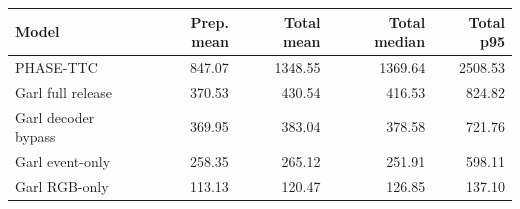 \begin{tabular}{lrrrr}
\toprule
Model & Prep. mean & Total mean & Total median & Total p95 \\
\midrule
PHASE-TTC & 847.07 & 1348.55 & 1369.64 & 2508.53 \\
Garl full release & 370.53 & 430.54 & 416.53 & 824.82 \\
Garl decoder bypass & 369.95 & 383.04 & 378.58 & 721.76 \\
Garl event-only & 258.35 & 265.12 & 251.91 & 598.11 \\
Garl RGB-only & 113.13 & 120.47 & 126.85 & 137.10 \\
\bottomrule
\end{tabular}
